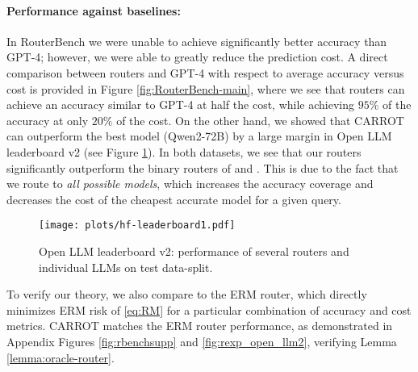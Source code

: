 \paragraph{Performance against baselines:} In {RouterBench} we were unable to achieve significantly better accuracy than GPT-4; however, we were able to greatly reduce the prediction cost. A direct comparison between routers and GPT-4 with respect to average accuracy versus cost is provided in Figure \ref{fig:RouterBench-main}, where we see that routers can achieve an accuracy similar to GPT-4 at half the cost, while achieving $95\%$ of the accuracy at only $20\%$ of the cost. On the other hand, we showed that CARROT can outperform the best model (Qwen2-72B) by a large margin in {Open LLM leaderboard v2} (see Figure \ref{fig:rexp_open_llm}). In both datasets, we see that our routers significantly outperform the binary routers of \citet{ong2024routellmlearningroutellms} and \citet{notdiamond2023rorf}. This is due to the fact that we route to \emph{all possible models}, which increases the accuracy coverage and decreases the cost of the cheapest accurate model for a given query.
\begin{figure}
    \centering
    \texttt{[image: plots/hf-leaderboard1.pdf]}
    \vspace{-0.3cm}
    \caption{Open LLM leaderboard v2: performance of several routers and individual LLMs on test data-split.}
    \label{fig:rexp_open_llm}
\end{figure}

To verify our theory, we also compare to the ERM router, which directly minimizes ERM risk of \eqref{eq:RM} for a particular combination of accuracy and cost metrics. CARROT matches the ERM router performance, as demonstrated in Appendix Figures \ref{fig:rbenchsupp} and \ref{fig:rexp_open_llm2}, verifying Lemma \ref{lemma:oracle-router}.%

